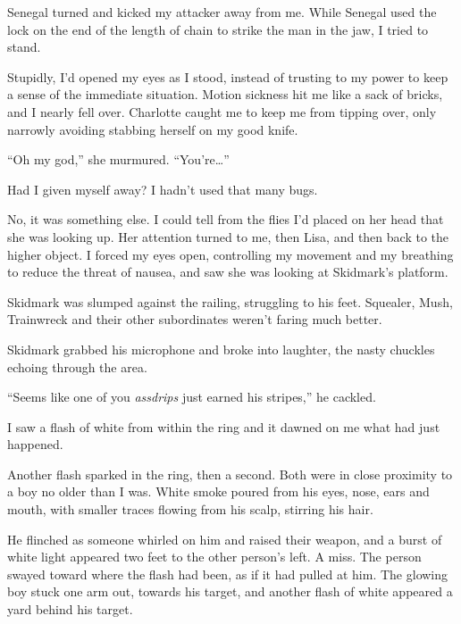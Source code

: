 Senegal turned and kicked my attacker away from me.  While Senegal used the lock on the end of the length of chain to strike the man in the jaw, I tried to stand.



Stupidly, I'd opened my eyes as I stood, instead of trusting to my power to keep a sense of the immediate situation.  Motion sickness hit me like a sack of bricks, and I nearly fell over.  Charlotte caught me to keep me from tipping over, only narrowly avoiding stabbing herself on my good knife.



``Oh my god,'' she murmured.  ``You're\ldots''



Had I given myself away?  I hadn't used that many bugs.



No, it was something else.  I could tell from the flies I'd placed on her head that she was looking up.  Her attention turned to me, then Lisa, and then back to the higher object.  I forced my eyes open, controlling my movement and my breathing to reduce the threat of nausea, and saw she was looking at Skidmark's platform.



Skidmark was slumped against the railing, struggling to his feet.  Squealer, Mush, Trainwreck and their other subordinates weren't faring much better.



Skidmark grabbed his microphone and broke into laughter, the nasty chuckles echoing through the area.



``Seems like one of you\emph{ assdrips} just earned his stripes,'' he cackled.



I saw a flash of white from within the ring and it dawned on me what had just happened.



Another flash sparked in the ring, then a second.  Both were in close proximity to a boy no older than I was.  White smoke poured from his eyes, nose, ears and mouth, with smaller traces flowing from his scalp, stirring his hair.



He flinched as someone whirled on him and raised their weapon, and a burst of white light appeared two feet to the other person's left.  A miss.  The person swayed toward where the flash had been, as if it had pulled at him.  The glowing boy stuck one arm out, towards his target, and another flash of white appeared a yard behind his target.



